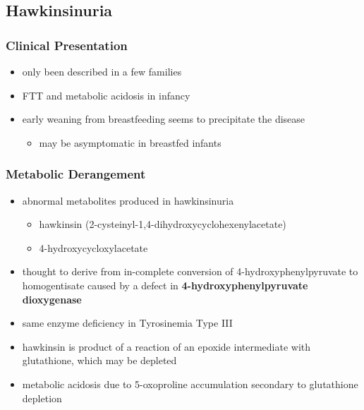 \documentclass[12pt]{scrartcl}
\begin{document}
\subsection{Hawkinsinuria}
\label{sec:orgd60bc23}
\subsubsection{Clinical Presentation}
\label{sec:org80ed409}
\begin{itemize}
\item only been described in a few families
\item FTT and metabolic acidosis in infancy
\item early weaning from breastfeeding seems to precipitate the disease
\begin{itemize}
\item may be asymptomatic in breastfed infants
\end{itemize}
\end{itemize}

\subsubsection{Metabolic Derangement}
\label{sec:org41a505b}
\begin{itemize}
\item abnormal metabolites produced in hawkinsinuria
\begin{itemize}
\item hawkinsin (2-cysteinyl-1,4-dihydroxycyclohexenylacetate)
\item 4-hydroxycycloxylacetate
\end{itemize}
\item thought to derive from in-complete conversion of
4-hydroxyphenylpyruvate to homogentisate caused by a defect in
\textbf{4-hydroxyphenylpyruvate dioxygenase}
\end{itemize}


\begin{itemize}
\item same enzyme deficiency in Tyrosinemia Type III
\item hawkinsin is product of a reaction of an epoxide intermediate with
glutathione, which may be depleted
\item metabolic acidosis due to 5-oxoproline accumulation secondary to
glutathione depletion
\end{itemize}
\end{document}

